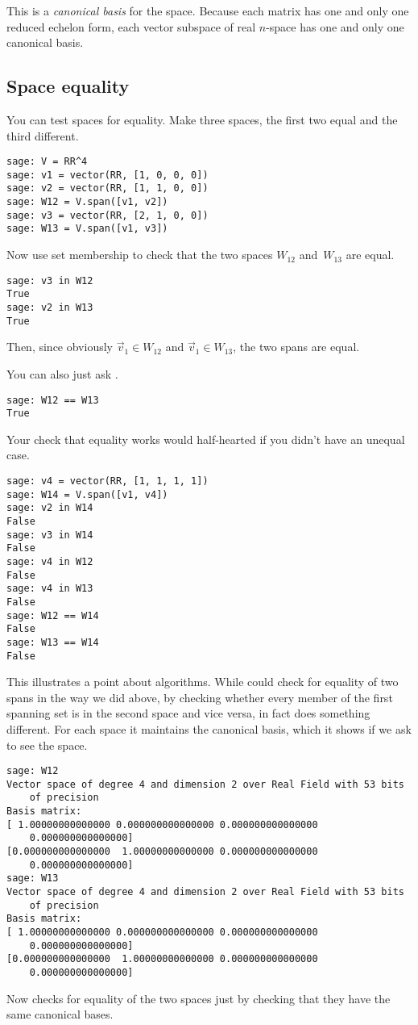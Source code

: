 This is a \textit{canonical basis} for the space.
Because each matrix has one and only one reduced echelon form, each 
vector subspace of real $n$-space has one and only one canonical
basis. 



\subsection{Space equality}

You can test spaces for equality.
Make three spaces, the first two equal and the third different.
\begin{lstlisting}
sage: V = RR^4
sage: v1 = vector(RR, [1, 0, 0, 0])
sage: v2 = vector(RR, [1, 1, 0, 0])
sage: W12 = V.span([v1, v2])
sage: v3 = vector(RR, [2, 1, 0, 0])
sage: W13 = V.span([v1, v3])  
\end{lstlisting}
Now use set membership to check that the two spaces $W_{12}$ and~$W_{13}$
are equal.
\begin{lstlisting}
sage: v3 in W12
True
sage: v2 in W13
True  
\end{lstlisting}
Then, since obviously $\vec{v}_1\in W_{12}$ and $\vec{v}_1\in W_{13}$, the two
spans are equal.

You can also just ask \Sage{}.
\begin{lstlisting}
sage: W12 == W13
True 
\end{lstlisting}

Your check that equality works would half-hearted if you didn't have 
an unequal case.
\begin{lstlisting}
sage: v4 = vector(RR, [1, 1, 1, 1])
sage: W14 = V.span([v1, v4])
sage: v2 in W14
False
sage: v3 in W14                                 
False
sage: v4 in W12
False
sage: v4 in W13
False
sage: W12 == W14                                                              
False
sage: W13 == W14
False 
\end{lstlisting}

This illustrates a point about algorithms.
While \Sage{} could check for equality of two spans in the way we
did above, by checking whether every member of the first spanning set is in the
second space and vice versa, in fact \Sage{} does something different.
For each space it maintains the canonical basis, which it shows if we 
ask to see the space.
\begin{lstlisting}
sage: W12                                                                      
Vector space of degree 4 and dimension 2 over Real Field with 53 bits 
    of precision
Basis matrix:
[ 1.00000000000000 0.000000000000000 0.000000000000000 
    0.000000000000000]
[0.000000000000000  1.00000000000000 0.000000000000000 
    0.000000000000000]
sage: W13
Vector space of degree 4 and dimension 2 over Real Field with 53 bits 
    of precision
Basis matrix:
[ 1.00000000000000 0.000000000000000 0.000000000000000 
    0.000000000000000]
[0.000000000000000  1.00000000000000 0.000000000000000 
    0.000000000000000]  
\end{lstlisting}
Now \Sage{} checks for equality of the two spaces 
just by checking that they have the same canonical bases.


